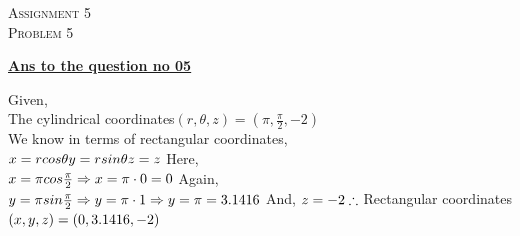 \documentclass{article}
\begin{document}
\begin{newpage}
    \begin{flushright}
    \textsc{Assignment 5}\\
    \textsc{Problem 5}\\
    [1 cm]
    \end{flushright}
\begin{center}
  \textbf{\Large \underline {Ans to the question no 05}}\\
  [0.5 cm]
\end{center}
\Large {Given, \\[3mm]
The cylindrical coordinates$ (r,\theta,z)=(\pi, \frac{\pi}{2},-2)$\\[3mm]
We know in terms of rectangular coordinates,\\[3mm]
$x=rcos\theta\\[3mm]
y=rsin\theta\\[3mm]
z=z\\[3mm]$
Here,\\[3mm]
$x=\pi cos\frac{\pi}{2}\\[3mm]
\Rightarrow x=\pi \cdot 0=0\\[3mm]$
Again,\\[3mm]
$y=\pi sin\frac{\pi}{2}\\[3mm]
\Rightarrow y=\pi \cdot 1\\[3mm]
\Rightarrow y=\pi =3.1416\\[3mm]$
And, $z=-2\\[5mm]
\therefore$ Rectangular coordinates $(x,y,z)=(0,3.1416,-2)\\[3mm]$}
\end{newpage}
\end{document}
